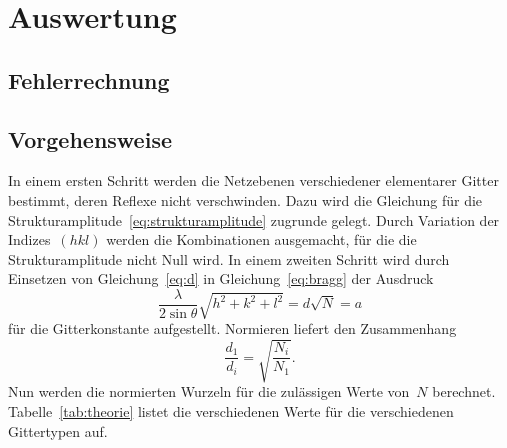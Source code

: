 ﻿\section{Auswertung}
\label{sec:auswertung}

\subsection{Fehlerrechnung}



\subsection{Vorgehensweise}

In einem ersten Schritt werden die Netzebenen verschiedener elementarer Gitter
bestimmt, deren Reflexe nicht verschwinden. Dazu wird die Gleichung für die
Strukturamplitude~\eqref{eq:strukturamplitude} zugrunde gelegt. Durch Variation
der Indizes~$(hkl)$ werden die Kombinationen ausgemacht, für die die
Strukturamplitude nicht Null wird. In einem zweiten Schritt wird durch Einsetzen
von Gleichung~\eqref{eq:d} in Gleichung~\eqref{eq:bragg} der Ausdruck
%
\begin{equation}
  \frac{\lambda}{2\sin\theta}\sqrt{h^2+k^2+l^2}=d\sqrt{N}=a
  \label{eq:a}
\end{equation}
%
für die Gitterkonstante aufgestellt. Normieren liefert den Zusammenhang
%
\begin{equation}
  \frac{d_1}{d_i}=\sqrt{\frac{N_i}{N_1}}.
\end{equation}
%
Nun werden die normierten Wurzeln für die zulässigen Werte von~$N$ berechnet.
Tabelle~\ref{tab:theorie} listet die verschiedenen Werte für die verschiedenen
Gittertypen auf.

